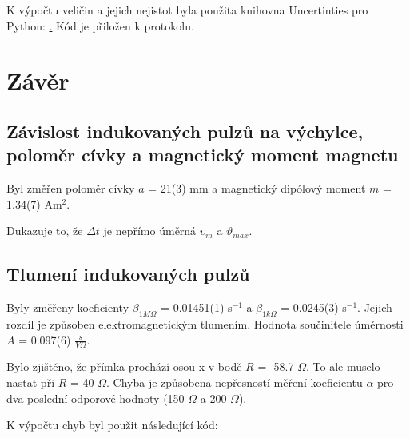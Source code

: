 \documentclass[a4paper,11pt]{article}
\begin{document}
    \begin{minipage}[t]{0.5\textwidth} 
                K výpočtu veličin a jejich nejistot byla použita knihovna Uncertinties pro Python: \href{pypi.org/project/uncertainties}. Kód je přiložen k protokolu.
        \section{Závěr}  
            \subsection{Závislost indukovaných pulzů na výchylce, poloměr cívky a magnetický moment magnetu}
                Byl změřen poloměr cívky $a$ = 21(3) mm a magnetický dipólový moment $m$ = 1.34(7) Am$^2$.
                \par Dukazuje to, že $\Delta t$ je nepřímo úměrná $\upsilon_m$ a $\vartheta_{max}$.
            \subsection{Tlumení indukovaných pulzů}
                Byly změřeny koeficienty $\beta_{1 M\Omega}$ = 0.01451(1) s$^{-1}$ a $\beta_{1 k\Omega}$ = 0.0245(3) s$^{-1}$. Jejich rozdíl je způsoben elektromagnetickým tlumením. Hodnota součinitele úměrnosti $A$ = 0.097(6) $\frac{s}{V \Omega}$.
                \par Bylo zjištěno, že přímka prochází osou x v bodě $R$ = -58.7 $\Omega$. To ale muselo nastat při $R$ = 40 $\Omega$. Chyba je způsobena nepřesností měření koeficientu $\alpha$ pro dva poslední odporové hodnoty (150 $\Omega$ a 200 $\Omega$).
    \end{minipage}
    \vspace{30pt}
    \par K výpočtu chyb byl použit následující kód: 
\end{document}
